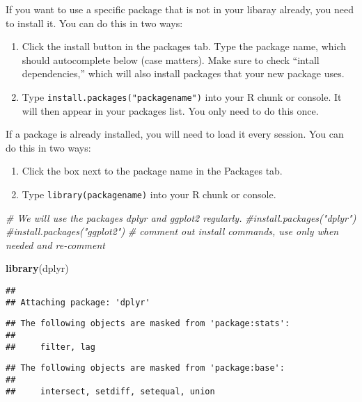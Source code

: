 \documentclass[]{article}
\newenvironment{Shaded}{\begin{snugshade}}{\end{snugshade}}
\newcommand{\CommentTok}[1]{\textcolor[rgb]{0.56,0.35,0.01}{\textit{#1}}}
\newcommand{\KeywordTok}[1]{\textcolor[rgb]{0.13,0.29,0.53}{\textbf{#1}}}
\newcommand{\NormalTok}[1]{#1}
\begin{document}
If you want to use a specific package that is not in your libaray
already, you need to install it. You can do this in two ways:

\begin{enumerate}
\def\labelenumi{\arabic{enumi}.}
\item
  Click the install button in the packages tab. Type the package name,
  which should autocomplete below (case matters). Make sure to check
  ``intall dependencies,'' which will also install packages that your
  new package uses.
\item
  Type \texttt{install.packages("packagename")} into your R chunk or
  console. It will then appear in your packages list. You only need to
  do this once.
\end{enumerate}

If a package is already installed, you will need to load it every
session. You can do this in two ways:

\begin{enumerate}
\def\labelenumi{\arabic{enumi}.}
\item
  Click the box next to the package name in the Packages tab.
\item
  Type \texttt{library(packagename)} into your R chunk or console.
\end{enumerate}

\begin{Shaded}
\begin{Highlighting}[]
\CommentTok{# We will use the packages dplyr and ggplot2 regularly. }
\CommentTok{#install.packages("dplyr") }
\CommentTok{#install.packages("ggplot2")}
\CommentTok{# comment out install commands, use only when needed and re-comment}

\KeywordTok{library}\NormalTok{(dplyr)}
\end{Highlighting}
\end{Shaded}

\begin{verbatim}
## 
## Attaching package: 'dplyr'
\end{verbatim}

\begin{verbatim}
## The following objects are masked from 'package:stats':
## 
##     filter, lag
\end{verbatim}

\begin{verbatim}
## The following objects are masked from 'package:base':
## 
##     intersect, setdiff, setequal, union
\end{verbatim}
\end{document}
